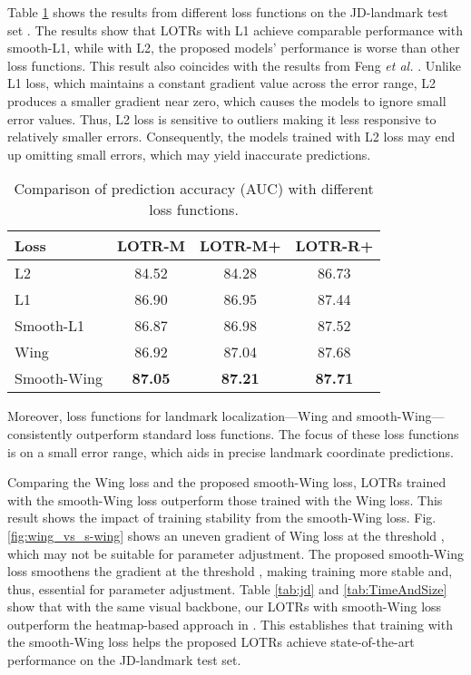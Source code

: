 \documentclass[journal]{IEEEtran}
\begin{document}
Table \ref{tab:losses} shows the results from different loss functions on the JD-landmark test set \cite{liu2019}.
The results show that LOTRs with L1 achieve comparable performance with smooth-L1, while with L2, the proposed models' performance is worse than other loss functions.
This result also coincides with the results from Feng \textit{et al.} \cite{Feng2017}.
Unlike L1 loss, which maintains a constant gradient value across the error range, L2 produces a smaller gradient near zero, which causes the models to ignore small error values.
Thus, L2 loss is sensitive to outliers making it less responsive to relatively smaller errors.
Consequently, the models trained with L2 loss may end up omitting small errors, which may yield inaccurate predictions.

\begin{table}
\caption{Comparison of prediction accuracy (AUC) with different loss functions.}
\centering
\begin{tabular}{lccc}
\hline
Loss        & LOTR-M & LOTR-M+ & LOTR-R+\\
\hline
L2           & 84.52  & 84.28   & 86.73\\
L1           & 86.90  & 86.95   & 87.44 \\
Smooth-L1    & 86.87  & 86.98   & 87.52 \\
Wing         & 86.92  & 87.04   & 87.68 \\
Smooth-Wing  & \textbf{87.05}  & \textbf{87.21}   & \textbf{87.71} \\
\hline
\end{tabular}
\par
\label{tab:losses}
\end{table}

Moreover, loss functions for landmark localization---Wing and smooth-Wing---consistently outperform standard loss functions.
The focus of these loss functions is on a small error range, which aids in precise landmark coordinate predictions.

Comparing the Wing loss and the proposed smooth-Wing loss, LOTRs trained with the smooth-Wing loss outperform those trained with the Wing loss. 
This result shows the impact of training stability from the smooth-Wing loss.
Fig. \ref{fig:wing_vs_s-wing} shows an uneven gradient of Wing loss at the threshold , which may not be suitable for parameter adjustment.
The proposed smooth-Wing loss smoothens the gradient at the threshold , making training more stable and, thus, essential for parameter adjustment.
Table \ref{tab:jd} and \ref{tab:TimeAndSize} show that with the same visual backbone, our LOTRs with smooth-Wing loss outperform the heatmap-based approach in \cite{earp2021sub}. 
This establishes that training with the smooth-Wing loss helps the proposed LOTRs achieve state-of-the-art performance on the JD-landmark test set.
\end{document}
